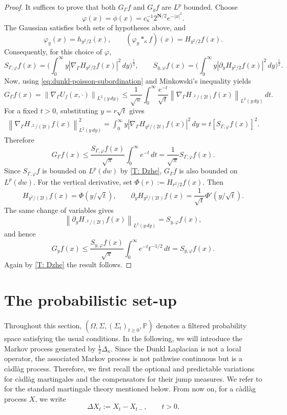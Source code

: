 \documentclass[11pt]{amsart}
\theoremstyle{definition}
\theoremstyle{remark}
\numberwithin{equation}{section}
\begin{document}
\begin{proof}
It suffices to prove that both $G_\Gamma f$ and $G_yf$ are $L^p$ bounded.
Choose
\[
\varphi(x)=\phi(x)
=
c_\kappa^{-1}2^{\mathbf N/2}e^{-|x|^2}.
\]
The Gaussian satisfies both sets of hypotheses above, and
\[
\varphi_y(x)=h_{y^2/2}(x),
\qquad
(\varphi_y*_\kappa f)(x)=H_{y^2/2}f(x).
\]
Consequently, for this choice of $\varphi$,
\[
S_{\Gamma,\varphi}f(x)
=\bigg(\int_0^\infty y|\nabla_\Gamma H_{y^2/2}f(x)|^2\,dy\bigg)^{\frac12},
\qquad
S_{y,\varphi}f(x)
=\bigg(\int_0^\infty y|\partial_y H_{y^2/2}f(x)|^2\,dy\bigg)^{\frac12}.
\]
Now, using \eqref{eq:dunkl-poisson-subordination} and Minkowski's inequality yields
\[
G_\Gamma f(x)
=\left\|\nabla_\Gamma U_f(x,\cdot)\right\|_{L^2(y\,dy)}
\leq\frac1{\sqrt\pi}\int_0^\infty\frac{e^{-t}}{\sqrt t}
\left\|\nabla_\Gamma H_{\cdot^2/(2t)}f(x)\right\|_{L^2(y\,dy)}\,dt.
\]
For a fixed $t>0$, substituting $y=r\sqrt t$ gives
\begin{align*}
\left\|\nabla_\Gamma H_{\cdot^2/(2t)}f(x)\right\|_{L^2(y\,dy)}^2
=\int_0^\infty y\left|\nabla_\Gamma H_{y^2/(2t)}f(x)\right|^2\,dy
=t\left[S_{\Gamma,\varphi}f(x)\right]^2.
\end{align*}
Therefore
\[
G_\Gamma f(x)\leq\frac{S_{\Gamma,\varphi}f(x)}{\sqrt\pi}
\int_0^\infty e^{-t}\,dt
=\frac1{\sqrt\pi}S_{\Gamma,\varphi}f(x).
\]
Since $S_{\Gamma,\varphi}f$ is bounded on $L^p(dw)$ by \cref{T: Dzhe}, $G_\Gamma f$ is also bounded on $L^p(dw)$. For the vertical derivative, set
$\Phi(r):=H_{r^2/2}f(x)$. Then
\[
H_{y^2/(2t)}f(x)=\Phi(y/\sqrt t),
\qquad
\partial_yH_{y^2/(2t)}f(x)
=
\frac1{\sqrt t}\Phi'(y/\sqrt t).
\]
The same change of variables gives
\[
\left\|\partial_yH_{\cdot^2/(2t)}f(x)\right\|_{L^2(y\,dy)}
=S_{y,\varphi}f(x),
\]
and hence
\[
G_yf(x)
\leq\frac{S_{y,\varphi}f(x)}{\sqrt\pi}
\int_0^\infty e^{-t}t^{-1/2}\,dt
=S_{y,\varphi}f(x).
\]
Again by \cref{T: Dzhe} the result follows.
\end{proof}

\section{The probabilistic set-up}
\label{prob set up}
Throughout this section,
$(\Omega,\Sigma,(\Sigma_t)_{t\geq0},\mathbb P)$ denotes a filtered
probability space satisfying the usual conditions. In the following, we will introduce the Markov process generated by
$\frac12\Delta_\kappa$. Since the Dunkl Laplacian is not a local operator, the associated Markov process is not pathwise continuous but is a c\`adl\`ag process. Therefore, we first recall the optional and predictable
variations for c\`adl\`ag martingales and the compensators for their jump measures. We refer to \cite{protter,cohell} for the standard martingale theory mentioned below. From now on, for a c\`adl\`ag process $X$, we write
\[
\Delta X_t:=X_t-X_{t-},
\qquad t>0.
\]
\end{document}
